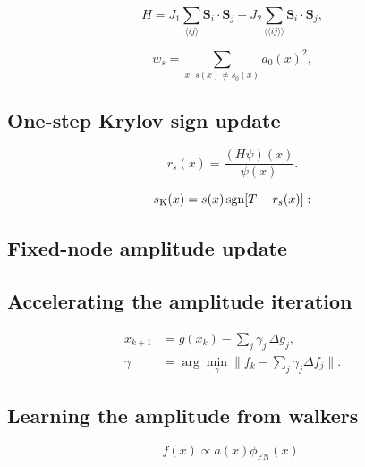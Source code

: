 \documentclass[aps,prb,reprint,superscriptaddress,floatfix]{revtex4-2}
\newcommand{\FN}{\mathrm{FN}}
\begin{document}
\begin{equation}
H=J_1\sum_{\langle ij\rangle}\mathbf S_i\!\cdot\!\mathbf S_j
 +J_2\sum_{\langle\!\langle ij\rangle\!\rangle}
 \mathbf S_i\!\cdot\!\mathbf S_j ,
\label{eq:H}
\end{equation}

\begin{equation}
w_s=\sum_{x:\,s(x)\neq s_0(x)} a_0(x)^2 ,
\label{eq:signweight}
\end{equation}

\subsection{One-step Krylov sign update}

\begin{equation}
r_s(x)=\frac{(H\psi)(x)}{\psi(x)} .
\label{eq:localenergy}
\end{equation}

\begin{equation}
s_{\rm K}(x)=s(x)\operatorname{sgn}[T-r_s(x)] :
\label{eq:k1}
\end{equation}

\subsection{Fixed-node amplitude update}

\subsection{Accelerating the amplitude iteration}

\begin{equation}
\begin{aligned}
x_{k+1}&=g(x_k)-\sum_{j}\gamma_j\,\Delta g_j,\\
\gamma&=\arg\min_\gamma\Big\|f_k-\sum_j\gamma_j\Delta f_j\Big\| .
\end{aligned}
\label{eq:anderson}
\end{equation}

\subsection{Learning the amplitude from walkers}

\begin{equation}
f(x)\propto a(x)\phi_\FN(x) .
\label{eq:mixed}
\end{equation}
\end{document}
